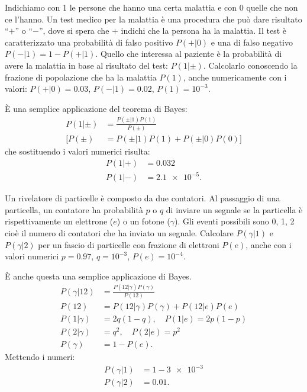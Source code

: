 
\begin{exercise}
	Indichiamo con 1 le persone che hanno una certa malattia e con 0 quelle che non ce l'hanno.
	Un test medico per la malattia è una procedura che può dare risultato ``$+$'' o ``$-$'',
	dove si spera che $+$ indichi che la persona ha la malattia.
	Il test è caratterizzato una probabilità di falso positivo $P(+|0)$ e una di falso negativo
	$P(-|1) = 1 - P(+|1)$.
	Quello che interessa al paziente è la probabilità di avere la malattia in base al risultato del test:
	$P(1|\pm)$. Calcolarlo conoscendo la frazione di popolazione che ha la malattia $P(1)$, anche numericamente con i valori: $P(+|0)=0.03$, $P(-|1)=0.02$, $P(1)=10^{-3}$.
\end{exercise}

\begin{solution*}
	È una semplice applicazione del teorema di Bayes:
	\begin{align*}
		P(1|\pm) &= \frac{P(\pm|1) P(1)}{P(\pm)} \\
		\Big[ P(\pm) &= P(\pm|1)P(1) + P(\pm|0)P(0) \Big]
	\end{align*}
	che sostituendo i valori numerici risulta:
	\begin{align*}
		P(1|+) &= 0.032 \\
		P(1|-) &= \num{2.1e-5}.
	\end{align*}
\end{solution*}

\begin{exercise}
	Un rivelatore di particelle è composto da due contatori.
	Al passaggio di una particella,
	un contatore ha probabilità $p$ o $q$ di inviare un segnale se la particella è rispettivamente
	un elettrone ($e$) o un fotone ($\gamma$).
	Gli eventi possibili sono 0, 1, 2 cioè il numero di contatori che ha inviato un segnale.
	Calcolare $P(\gamma|1)$ e $P(\gamma|2)$ per un fascio di particelle con frazione di elettroni $P(e)$,
	anche con i valori numerici $p=0.97$, $q=10^{-3}$, $P(e)=10^{-4}$.
\end{exercise}

\begin{solution*}
	È anche questa una semplice applicazione di Bayes.
	\begin{align*}
		P(\gamma|12) &= \frac{P(12|\gamma) P(\gamma)}{P(12)} \\
		P(12) &= P(12|\gamma)P(\gamma) + P(12|e)P(e) \\
		P(1|\gamma) &= 2q(1-q), \quad P(1|e) = 2p(1-p) \\
		P(2|\gamma) &= q^2, \quad P(2|e) = p^2 \\
		P(\gamma) &= 1 - P(e).
	\end{align*}
	Mettendo i numeri:
	\begin{align*}
		P(\gamma|1) &= 1 - \num{3e-3} \\
		P(\gamma|2) &= 0.01.
	\end{align*}
\end{solution*}

